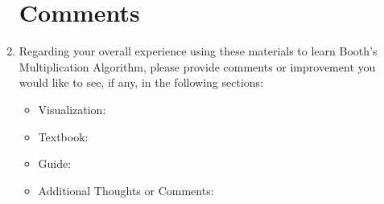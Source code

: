 \documentclass[letter]{article}
\begin{document}
\begin{enumerate}
\section*{Comments}

\item Regarding your overall experience using these materials to learn Booth's Multiplication Algorithm, please provide comments or improvement you would like to see, if any, in the following sections:
\begin{itemize}
\item Visualization:
\vspace{.75cm}
\item Textbook:
\vspace{.75cm}
\item Guide:
\vspace{.75cm}
\item Additional Thoughts or Comments:

\end{itemize}

\end{enumerate}
\end{document}
